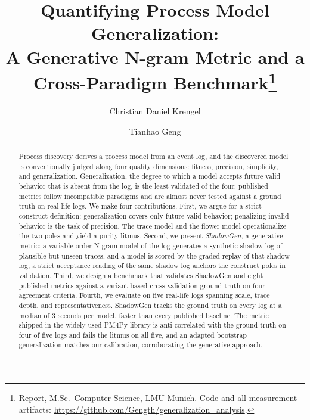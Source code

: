 \documentclass[runningheads]{llncs}
\begin{document}
\title{Quantifying Process Model Generalization:\\
A Generative N-gram Metric and a Cross-Paradigm Benchmark\thanks{Report, M.Sc.\ Computer Science, LMU Munich. Code and all measurement artifacts: \url{https://github.com/Gength/generalization_analysis}.}}

\author{Christian Daniel Krengel \and Tianhao Geng}

\maketitle

\begin{abstract}
Process discovery derives a process model from an event log, and the discovered model is conventionally judged along four quality dimensions: fitness, precision, simplicity, and generalization. Generalization, the degree to which a model accepts future valid behavior that is absent from the log, is the least validated of the four: published metrics follow incompatible paradigms and are almost never tested against a ground truth on real-life logs. We make four contributions. First, we argue for a strict construct definition: generalization covers only future valid behavior; penalizing invalid behavior is the task of precision. The trace model and the flower model operationalize the two poles and yield a purity litmus. Second, we present \emph{ShadowGen}, a generative metric: a variable-order N-gram model of the log generates a synthetic shadow log of plausible-but-unseen traces, and a model is scored by the graded replay of that shadow log; a strict acceptance reading of the same shadow log anchors the construct poles in validation. Third, we design a benchmark that validates ShadowGen and eight published metrics against a variant-based cross-validation ground truth on four agreement criteria. Fourth, we evaluate on five real-life logs spanning scale, trace depth, and representativeness. ShadowGen tracks the ground truth on every log at a median of $3$ seconds per model, faster than every published baseline. The metric shipped in the widely used PM4Py library is anti-correlated with the ground truth on four of five logs and fails the litmus on all five, and an adapted bootstrap generalization matches our calibration, corroborating the generative approach.

\end{abstract}
\end{document}
